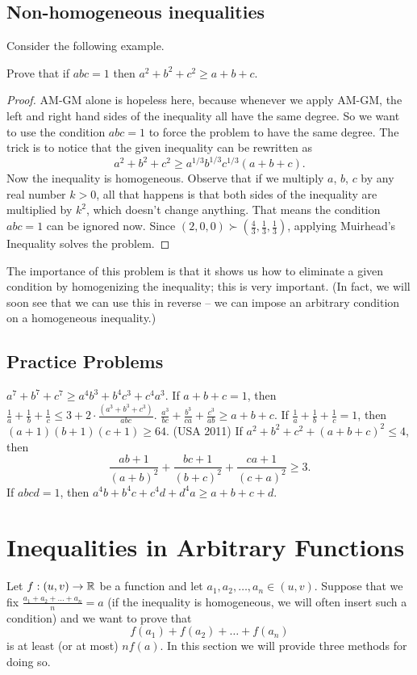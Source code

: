 \documentclass[11pt]{scrartcl}
\begin{document}
\subsection{Non-homogeneous inequalities}
Consider the following example.
\begin{example}
	Prove that if $abc=1$ then $a^2+b^2+c^2 \ge a+b+c$.
\end{example}
\begin{proof}
	AM-GM alone is hopeless here, because whenever we apply AM-GM, the left and right hand sides of the inequality all have the same degree.
	So we want to use the condition $abc=1$ to force the problem to have the same degree.
	The trick is to notice that the given inequality can be rewritten as 
	\[ a^2+b^2+c^2 \ge a^{1/3}b^{1/3}c^{1/3} \left( a+b+c \right). \]
	Now the inequality is homogeneous.
	Observe that if we multiply $a$, $b$, $c$ by any real number $k > 0$, all that happens is that both sides of the inequality are multiplied by $k^2$, which doesn't change anything.
	That means the condition $abc = 1$ can be ignored now.
	Since $(2,0,0) \succ (\frac 43, \frac 13, \frac 13)$, applying Muirhead's Inequality solves the problem.
\end{proof}

The importance of this problem is that it shows us how to eliminate a given condition by homogenizing the inequality; this is very important. (In fact, we will soon see that we can use this in reverse -- we can impose an arbitrary condition on a homogeneous inequality.)

\subsection{Practice Problems}
\begin{enumerate}
	\ii $a^7+b^7+c^7 \ge a^4b^3+b^4c^3+c^4a^3$.
	\ii If $a+b+c=1$, then $\frac1a + \frac 1b + \frac 1c \le 3 + 2 \cdot \frac{(a^3+b^3+c^3)}{abc}$.
	\ii $\frac{a^3}{bc} + \frac{b^3}{ca} + \frac{c^3}{ab} \ge a+b+c$.
	\ii If $\frac1a + \frac1b + \frac 1c =1$, then $(a+1)(b+1)(c+1) \ge 64$.
	\ii (USA 2011) If $a^2+b^2+c^2+(a+b+c)^2 \le 4$, then
	\[ \frac{ab+1}{(a+b)^2} + \frac{bc+1}{(b+c)^2} + \frac{ca+1}{(c+a)^2} \ge 3. \]
	\ii If $abcd=1$, then $a^4b+b^4c+c^4d+d^4a \ge a+b+c+d$.
\end{enumerate}

\section{Inequalities in Arbitrary Functions}
Let $f : (u,v) \to \mathbb R$ be a function and let $a_1, a_2, \dots, a_n \in (u,v)$.
Suppose that we fix $\frac{a_1+a_2 + \dots + a_n}{n} = a$ (if the inequality is homogeneous, we will often insert such a condition)
and we want to prove that
\[ f(a_1) + f(a_2) + \dots + f(a_n) \]
is at least (or at most) $nf(a)$.
In this section we will provide three methods for doing so.
\end{document}
